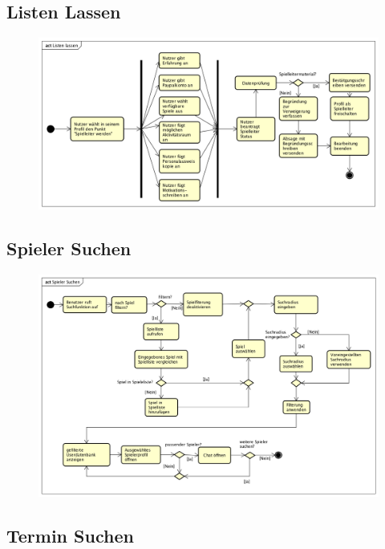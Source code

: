 \vfill

\subsection*{Listen Lassen}
\begin{figure}[h!]
	\centering
	\includegraphics[width=0.8\linewidth]{docs/3_Aktivitaetsdiagramme/Markus/Listen_Lassen.png}
	\label{fig:ActDia_Listen_Lassen}
\end{figure}

\vfill

\subsection*{Spieler Suchen}
\begin{figure}[h!]
	\centering
	\includegraphics[width=0.8\linewidth]{docs/3_Aktivitaetsdiagramme/Markus/Spieler_Suchen.png}
	\label{fig:ActDia_Spieler_Suchen}
\end{figure}

\vfill
\pagebreak
\vfill

\subsection*{Termin Suchen}
\begin{figure}[h!]
	\centering
	\label{fig:ActDia_Termin_Suchen}
\end{figure}

\vfill